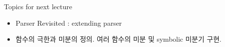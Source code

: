 \documentclass{beamer}
\begin{document}




\begin{frame}{Topics for next lecture} 

\begin{itemize} 
\item Parser Revisited : extending parser
\item 함수의 극한과 미분의 정의. 여러 함수의 미분 및 symbolic 미분기 구현. 
\end{itemize}

\end{frame}
\end{document}
